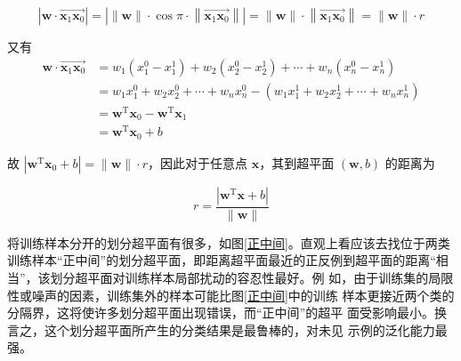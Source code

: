 \documentclass{ctexart}
\begin{document}
	\begin{equation}
		\left|\boldsymbol{w} \cdot \overrightarrow{\boldsymbol{x}_{1} \boldsymbol{x}_{0}}\right|=\left|\|\boldsymbol{w}\| \cdot \cos \pi \cdot\left\|\overrightarrow{\boldsymbol{x}_{1} \boldsymbol{x}_{0}}\right\|\right|=\|\boldsymbol{w}\| \cdot\left\|\overrightarrow{\boldsymbol{x}_{1} \boldsymbol{x}_{0}}\right\|=\|\boldsymbol{w}\| \cdot r 
	\end{equation}
	
	又有
	\begin{equation}
		\begin{aligned}
			\boldsymbol{w} \cdot \overrightarrow{\boldsymbol{x}_{1} \boldsymbol{x}_{0}} &=w_{1}\left(x_{1}^{0}-x_{1}^{1}\right)+w_{2}\left(x_{2}^{0}-x_{2}^{1}\right)+\cdots+w_{n}\left(x_{n}^{0}-x_{n}^{1}\right) \\
			&=w_{1} x_{1}^{0}+w_{2} x_{2}^{0}+\cdots+w_{n} x_{n}^{0}-\left(w_{1} x_{1}^{1}+w_{2} x_{2}^{1}+\cdots+w_{n} x_{n}^{1}\right) \\
			&=\boldsymbol{w}^{\mathrm{T}} \boldsymbol{x}_{0}-\boldsymbol{w}^{\mathrm{T}} \boldsymbol{x}_{1} \\
			&=\boldsymbol{w}^{\mathrm{T}} \boldsymbol{x}_{0}+b
		\end{aligned}
	\end{equation}
	
	故 $\left|\boldsymbol{w}^{\mathrm{T}} \boldsymbol{x}_{0}+b\right|=\|\boldsymbol{w}\| \cdot r$，因此对于任意点 $\boldsymbol{x}$，其到超平面 $(\boldsymbol{w},b)$ 的距离为
	
	\begin{equation}
		r=\frac{\left|\boldsymbol{w}^{\mathrm{T}} \boldsymbol{x}+b\right|}{\|\boldsymbol{w}\|}
	\end{equation}

	将训练样本分开的划分超平面有很多，如图\ref{正中间}。直观上看应该去找位于两类训练样本“正中间”的划分超平面，即距离超平面最近的正反例到超平面的距离“相当”，该划分超平面对训练样本局部扰动的容忍性最好。例
	如，由于训练集的局限性或噪声的因素，训练集外的样本可能比图\ref{正中间}中的训练
	样本更接近两个类的分隔界，这将使许多划分超平面出现错误，而“正中间”的超平
	面受影响最小。换言之，这个划分超平面所产生的分类结果是最鲁棒的，对未见
	示例的泛化能力最强。
	
\end{document}
